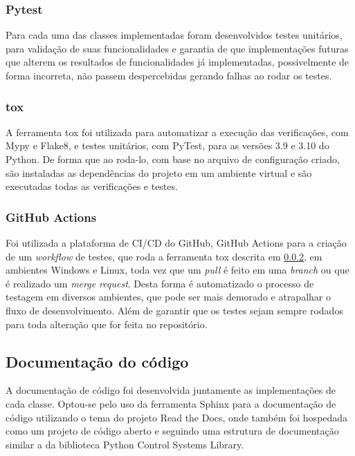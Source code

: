 \subsubsection{Pytest}

Para cada uma das classes implementadas foram desenvolvidos testes unitários, para validação de suas funcionalidades e
garantia de que implementações futuras que alterem os resultados de funcionalidades já implementadas, possivelmente de
forma incorreta, não passem despercebidas gerando falhas ao rodar os testes.

\subsubsection{tox}\label{subsubsec:devtox}

A ferramenta tox foi utilizada para automatizar a execução das verificações, com Mypy e Flake8, e testes unitários, com
PyTest, para as versões 3.9 e 3.10 do Python.
De forma que ao roda-lo, com base no arquivo de configuração criado, são instaladas as dependências do projeto em um
ambiente virtual e são executadas todas as verificações e testes.

\subsubsection{GitHub Actions}

Foi utilizada a plataforma de CI/CD do GitHub, GitHub Actions para a criação de um \textit{workflow} de testes, que roda a
ferramenta tox descrita em \ref{subsubsec:devtox}, em ambientes Windows e Linux, toda vez que um \textit{pull} é feito em uma
\textit{branch} ou que é realizado um \textit{merge request}.
Desta forma é automatizado o processo de testagem em diversos ambientes, que pode ser mais demorado e atrapalhar o
fluxo de desenvolvimento.
Além de garantir que os testes sejam sempre rodados para toda alteração que for feita no repositório.

\subsection{Documentação do código}

A documentação de código foi desenvolvida juntamente as implementações de cada classe.
Optou-se pelo uso da ferramenta Sphinx para a documentação de código utilizando o tema do projeto Read the Docs, onde
também foi hospedada como um projeto de código aberto e seguindo uma estrutura de documentação similar a da
biblioteca Python Control Systems Library.

